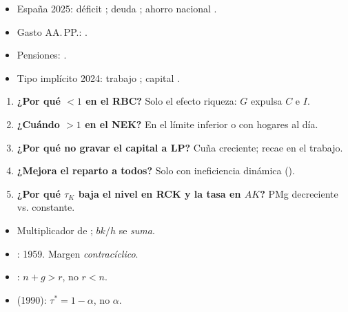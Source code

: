 \documentclass{article}
\begin{document}
\begin{columnas}
\anexorepaso
{}
\begin{itemize}
\item España 2025: déficit ; deuda ; ahorro nacional .
\item Gasto AA.\,PP.: .
\item Pensiones: .
\item Tipo implícito 2024: trabajo ; capital .
\end{itemize}
\begin{enumerate}
\item \textbf{¿Por qué $<1$ en el RBC?} Solo el efecto riqueza: $G$ expulsa $C$ e $I$.
\item \textbf{¿Cuándo $>1$ en el NEK?} En el límite inferior o con hogares al día.
\item \textbf{¿Por qué no gravar el capital a LP?} Cuña creciente; recae en el trabajo.
\item \textbf{¿Mejora el reparto a todos?} Solo con ineficiencia dinámica ().
\item \textbf{¿Por qué $\tau_K$ baja el nivel en RCK y la tasa en $AK$?} PMg decreciente vs. constante.
\end{enumerate}
\begin{trampa}
\begin{itemize}
\item Multiplicador de ; $bk/h$ se \emph{suma}.
\item {}: 1959. Margen \emph{contracíclico}.
\item {}: $n+g>r$, no $r<n$.
\item {} (1990): $\tau^*=1-\alpha$, no $\alpha$.
\end{itemize}
\end{trampa}

\end{columnas}
\end{document}
